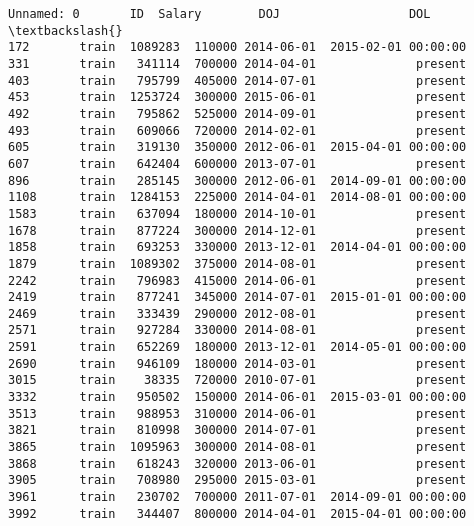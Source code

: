 \documentclass[11pt]{article}
\makeatletter
\newcommand{\boxspacing}{\kern\kvtcb@left@rule\kern\kvtcb@boxsep}
\newcommand{\prompt}[4]{
        \ttfamily\llap{{\color{#2}[#3]:\hspace{3pt}#4}}\vspace{-\baselineskip}
    }
\makeatother
\begin{document}
            \begin{tcolorbox}[breakable, size=fbox, boxrule=.5pt, pad at break*=1mm, opacityfill=0]
\prompt{Out}{outcolor}{44}{\boxspacing}
\begin{Verbatim}[commandchars=\\\{\}]
     Unnamed: 0       ID  Salary        DOJ                  DOL  \textbackslash{}
172       train  1089283  110000 2014-06-01  2015-02-01 00:00:00
331       train   341114  700000 2014-04-01              present
403       train   795799  405000 2014-07-01              present
453       train  1253724  300000 2015-06-01              present
492       train   795862  525000 2014-09-01              present
493       train   609066  720000 2014-02-01              present
605       train   319130  350000 2012-06-01  2015-04-01 00:00:00
607       train   642404  600000 2013-07-01              present
896       train   285145  300000 2012-06-01  2014-09-01 00:00:00
1108      train  1284153  225000 2014-04-01  2014-08-01 00:00:00
1583      train   637094  180000 2014-10-01              present
1678      train   877224  300000 2014-12-01              present
1858      train   693253  330000 2013-12-01  2014-04-01 00:00:00
1879      train  1089302  375000 2014-08-01              present
2242      train   796983  415000 2014-06-01              present
2419      train   877241  345000 2014-07-01  2015-01-01 00:00:00
2469      train   333439  290000 2012-08-01              present
2571      train   927284  330000 2014-08-01              present
2591      train   652269  180000 2013-12-01  2014-05-01 00:00:00
2690      train   946109  180000 2014-03-01              present
3015      train    38335  720000 2010-07-01              present
3332      train   950502  150000 2014-06-01  2015-03-01 00:00:00
3513      train   988953  310000 2014-06-01              present
3821      train   810998  300000 2014-07-01              present
3865      train  1095963  300000 2014-08-01              present
3868      train   618243  320000 2013-06-01              present
3905      train   708980  295000 2015-03-01              present
3961      train   230702  700000 2011-07-01  2014-09-01 00:00:00
3992      train   344407  800000 2014-04-01  2015-04-01 00:00:00


\end{Verbatim}
\end{tcolorbox}
\end{document}
